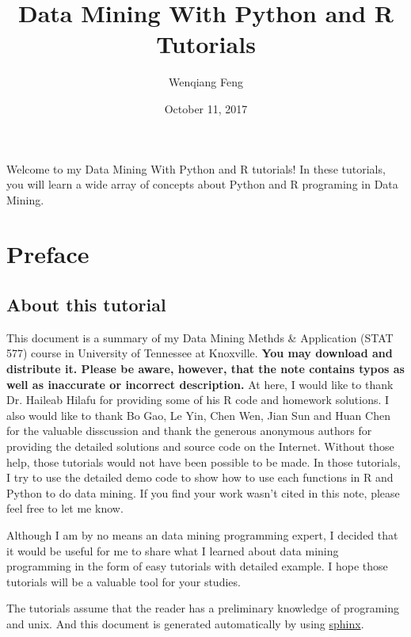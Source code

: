 \documentclass[letterpaper,11pt,english]{sphinxmanual}
\title{Data Mining With Python and R Tutorials}
\date{October 11, 2017}
\author{Wenqiang Feng}
\begin{document}
\maketitle
\tableofcontents
{}\label{index::doc}\label{index:index}
Welcome to my Data Mining With Python and R tutorials! In these tutorials, you will learn a wide array
of concepts about Python and R programing in Data Mining.




\chapter{Preface}
\label{preface:id1}\label{preface::doc}\label{preface:contents}\label{preface:preface}

\section{About this tutorial}
\label{preface:about-this-tutorial}
This document is a summary of my Data Mining Methds \& Application (STAT 577) course in University of Tennessee at Knoxville.  \textbf{You may
download and distribute it. Please be aware, however, that the note contains typos as well as inaccurate or
incorrect description.} At here, I would like to thank Dr. Haileab Hilafu for providing some of his R code and
homework solutions. I also would like to thank Bo Gao, Le Yin, Chen Wen, Jian Sun and Huan Chen for the valuable disscussion
and thank the generous anonymous authors for providing the detailed solutions and source code on the Internet.
Without those help, those tutorials would not have been possible to be made. In those tutorials, I try to use the
detailed demo code to show how to use each functions in R and Python to do data mining. If you find your work wasn't cited in
this note, please feel free to let me know.

Although I am by no means an data mining programming expert, I decided that it would be useful for me to share what I learned
about data mining programming in the form of easy tutorials with detailed example. I hope those tutorials will be a valuable tool for your studies.

The tutorials assume that the reader has a preliminary knowledge of programing and unix. And this document is generated automatically by using \href{http://sphinx.pocoo.org}{sphinx}.
\end{document}
